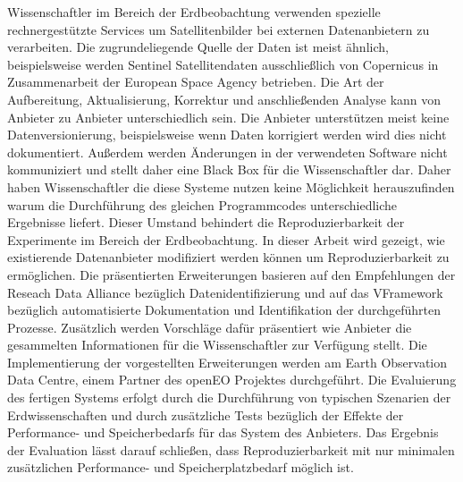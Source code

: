 \documentclass[draft,final]{vutinfth} %
\newcommand{\bgoesswein}[1]{{\color{blue}#1}}
\begin{document}
\begin{kurzfassung}
Wissenschaftler im Bereich der Erdbeobachtung verwenden spezielle rechnergestützte Services um Satellitenbilder bei externen Datenanbietern zu verarbeiten. Die zugrundeliegende Quelle der Daten ist meist ähnlich, beispielsweise werden Sentinel Satellitendaten ausschließlich von Copernicus in Zusammenarbeit der European Space Agency betrieben. Die Art der Aufbereitung, Aktualisierung, Korrektur und anschließenden Analyse kann von Anbieter zu Anbieter unterschiedlich sein. 
Die Anbieter unterstützen meist keine Datenversionierung, beispielsweise wenn Daten korrigiert werden wird dies nicht dokumentiert. Außerdem werden Änderungen in der verwendeten Software nicht kommuniziert und stellt daher eine Black Box für die Wissenschaftler dar. Daher haben Wissenschaftler die diese Systeme nutzen keine Möglichkeit herauszufinden warum die Durchführung des gleichen Programmcodes unterschiedliche Ergebnisse liefert. Dieser Umstand behindert die Reproduzierbarkeit der Experimente im Bereich der Erdbeobachtung. 
In dieser Arbeit wird gezeigt, wie existierende Datenanbieter modifiziert werden können um Reproduzierbarkeit zu ermöglichen. Die präsentierten Erweiterungen basieren auf den Empfehlungen der Reseach Data Alliance bezüglich Datenidentifizierung und auf das \bgoesswein{\mbox{VFramework}} bezüglich automatisierte Dokumentation und Identifikation der durchgeführten Prozesse. Zusätzlich werden Vorschläge dafür präsentiert wie Anbieter die gesammelten Informationen für die Wissenschaftler zur Verfügung stellt. Die Implementierung der vorgestellten Erweiterungen werden am Earth Observation Data Centre, einem Partner des openEO Projektes durchgeführt. Die Evaluierung des fertigen Systems erfolgt durch die Durchführung von typischen Szenarien der Erdwissenschaften und durch zusätzliche Tests bezüglich der Effekte der Performance- und Speicherbedarfs für das System des Anbieters. Das Ergebnis der Evaluation lässt darauf schließen, dass Reproduzierbarkeit mit nur minimalen zusätzlichen Performance- und Speicherplatzbedarf möglich ist.          
\end{kurzfassung}
\end{document}
